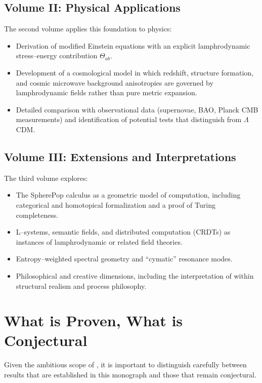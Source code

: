 \subsection*{Volume II: Physical Applications}

The second volume applies this foundation to physics:
\begin{itemize}
  \item Derivation of modified Einstein equations with an explicit lamphrodynamic
  stress--energy contribution $\Theta_{ab}$.
  \item Development of a cosmological model in which redshift, structure
  formation, and cosmic microwave background anisotropies are governed by
  lamphrodynamic fields rather than pure metric expansion.
  \item Detailed comparison with observational data (supernovae, BAO, Planck
  CMB measurements) and identification of potential tests that distinguish
  \rsvpabbr{} from $\Lambda$CDM.
\end{itemize}

\subsection*{Volume III: Extensions and Interpretations}

The third volume explores:
\begin{itemize}
  \item The SpherePop calculus as a geometric model of computation, including
  categorical and homotopical formalization and a proof of Turing completeness.
  \item L--systems, semantic fields, and distributed computation (CRDTs) as
  instances of lamphrodynamic or related field theories.
  \item Entropy--weighted spectral geometry and ``cymatic'' resonance modes.
  \item Philosophical and creative dimensions, including the interpretation of
  \rsvpabbr{} within structural realism and process philosophy.
\end{itemize}

\section{What is Proven, What is Conjectural}

Given the ambitious scope of \rsvpabbr{}, it is important to distinguish
carefully between results that are established in this monograph and those
that remain conjectural.

